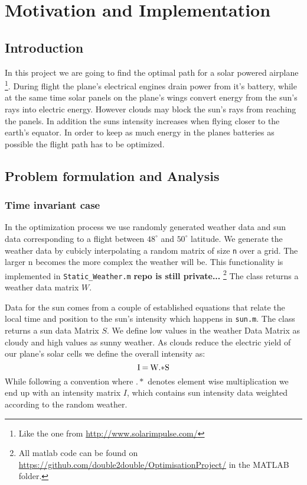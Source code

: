 \documentclass[ twoside,openright,titlepage,numbers=noenddot,headinclude,%
                footinclude=true,cleardoublepage=empty,abstractoff, %
                BCOR=5mm,paper=a4,fontsize=11pt,%
                ngerman,american,%
                ]{scrreprt}
\begin{document}
\frenchspacing
\raggedbottom
{} %
\pagestyle{plain}

%
\pagestyle{scrheadings}



\chapter{Motivation and Implementation}
\section{Introduction}
In this project we are going to find the optimal path for a solar powered airplane \footnote{Like the one from \url{http://www.solarimpulse.com/}}. During flight the plane's electrical engines drain power from it's battery, while at the same time solar panels on the plane's wings convert energy from the sun's rays into electric energy. However clouds may block the sun's rays from reaching the panels. In addition the suns intensity increases when flying closer to the earth's equator. In order to keep as much energy in the planes batteries as possible the flight path has to be optimized.

\section{Problem formulation and Analysis}
\subsection{Time invariant case}
In the optimization process we use randomly generated weather data and sun data corresponding to a flight between $48^\circ$ and $50^\circ$ latitude. We generate the weather data by cubicly interpolating a random matrix of size \texttt{n} over a grid. The larger n becomes the more complex the weather will be. This functionality is implemented in \texttt{Static\_Weather.m} \textbf{repo is still private...} \footnote{All matlab code can be found on \url{https://github.com/double2double/OptimisationProject/} in the MATLAB folder.} The class returns a weather data matrix $W$.

Data for the sun comes from a couple of established equations that relate the local time and position to the sun's intensity  which happens in \texttt{sun.m}. The class returns a sun data Matrix $S$. We define low values in the weather Data Matrix as cloudy and high values as sunny weather. As clouds reduce the electric yield of our plane's solar cells we define the overall intensity as:
\begin{equation}
$I$ \:= \: $W$ .* $S$
\end{equation}
While following a convention where $.*$ denotes element wise multiplication we end up with an intensity matrix $I$, which contains sun intensity data weighted according to the random weather.
\end{document}
